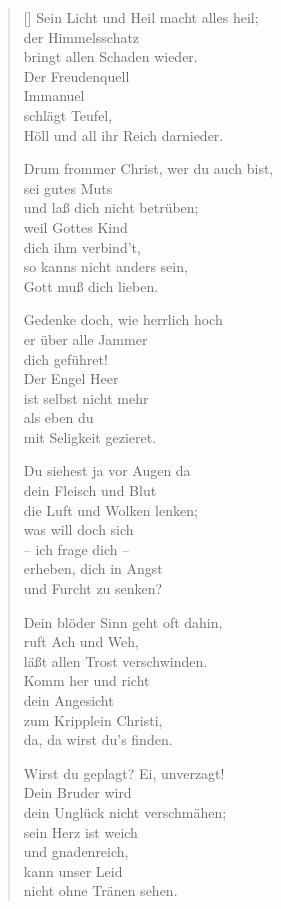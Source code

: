 \begin{multicols}{2}
\begin{verse}[\versewidth]
 Sein Licht und Heil macht alles heil;\\
der Himmelsschatz\\
bringt allen Schaden wieder.\\
Der Freudenquell\\
Immanuel\\
schlägt Teufel,\\
Höll und all ihr Reich darnieder.

 Drum frommer Christ, wer du auch bist,\\
sei gutes Muts\\
und laß dich nicht betrüben;\\
weil Gottes Kind\\
dich ihm verbind't,\\
so kanns nicht anders sein,\\
Gott muß dich lieben.

 Gedenke doch, wie herrlich hoch\\
er über alle Jammer\\
dich geführet!\\
Der Engel Heer\\
ist selbst nicht mehr\\
als eben du\\
mit Seligkeit gezieret.

 Du siehest ja vor Augen da\\
dein Fleisch und Blut\\
die Luft und Wolken lenken;\\
was will doch sich\\
– ich frage dich –\\
erheben, dich in Angst\\
und Furcht zu senken?

 Dein blöder Sinn geht oft dahin,\\
ruft Ach und Weh,\\
läßt allen Trost verschwinden.\\
Komm her und richt\\
dein Angesicht\\
zum Kripplein Christi,\\
da, da wirst du's finden.

 Wirst du geplagt? Ei, unverzagt!\\
Dein Bruder wird\\
dein Unglück nicht verschmähen;\\
sein Herz ist weich\\
und gnadenreich,\\
kann unser Leid\\
nicht ohne Tränen sehen.


\end{verse}
\end{multicols}
